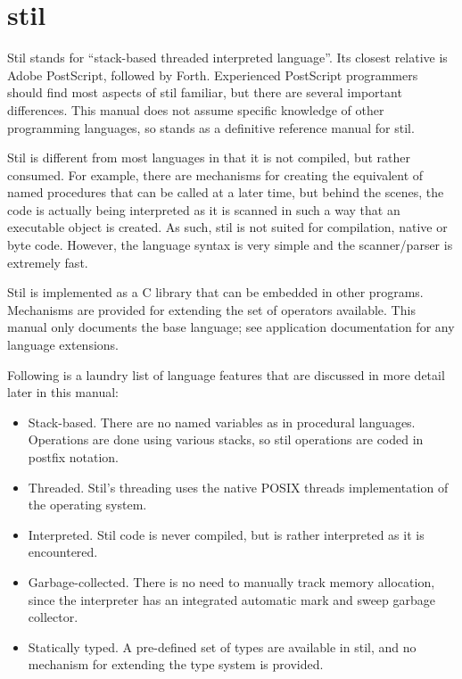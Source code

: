 %
%
%
%
%              

\clearemptydoublepage
\chapter{stil}
\label{stillang}

Stil stands for ``stack-based threaded interpreted language''.  Its closest
relative is Adobe PostScript, followed by Forth.  Experienced PostScript
programmers should find most aspects of stil familiar, but there are several
important differences.  This manual does not assume specific knowledge of other
programming languages, so stands as a definitive reference manual for stil.

Stil is different from most languages in that it is not compiled, but rather
consumed.  For example, there are mechanisms for creating the equivalent of
named procedures that can be called at a later time, but behind the scenes, the
code is actually being interpreted as it is scanned in such a way that an
executable object is created.  As such, stil is not suited for compilation,
native or byte code.  However, the language syntax is very simple and the
scanner/parser is extremely fast.

Stil is implemented as a C library that can be embedded in other programs.
Mechanisms are provided for extending the set of operators available.  This
manual only documents the base language; see application documentation for any
language extensions.

Following is a laundry list of language features that are discussed in more
detail later in this manual:

\begin{itemize}
\item{Stack-based.  There are no named variables as in procedural languages.
Operations are done using various stacks, so stil operations are coded in
postfix notation.}
\item{Threaded.  Stil's threading uses the native POSIX threads implementation
of the operating system.}
\item{Interpreted.  Stil code is never compiled, but is rather interpreted as it
is encountered.}
\item{Garbage-collected.  There is no need to manually track memory allocation,
since the interpreter has an integrated automatic mark and sweep garbage
collector.}
\item{Statically typed.  A pre-defined set of types are available in stil, and
no mechanism for extending the type system is provided.}
\end{itemize}

